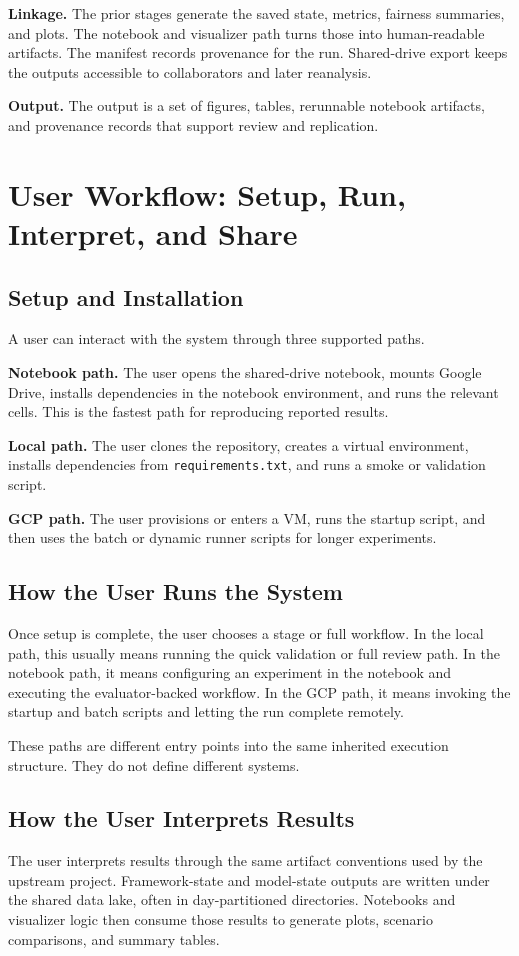 \documentclass{IEEEtran}
\begin{document}
\textbf{Linkage.} The prior stages generate the saved state, metrics,
fairness summaries, and plots. The notebook and visualizer path turns those
into human-readable artifacts. The manifest records provenance for the run.
Shared-drive export keeps the outputs accessible to collaborators and later
reanalysis.

\textbf{Output.} The output is a set of figures, tables, rerunnable notebook
artifacts, and provenance records that support review and replication.

\section{User Workflow: Setup, Run, Interpret, and Share}

\subsection{Setup and Installation}
A user can interact with the system through three supported paths.

\textbf{Notebook path.} The user opens the shared-drive notebook, mounts Google
Drive, installs dependencies in the notebook environment, and runs the relevant
cells. This is the fastest path for reproducing reported results.

\textbf{Local path.} The user clones the repository, creates a virtual
environment, installs dependencies from \texttt{requirements.txt}, and runs a
smoke or validation script.

\textbf{GCP path.} The user provisions or enters a VM, runs the startup script,
and then uses the batch or dynamic runner scripts for longer experiments.

\subsection{How the User Runs the System}
Once setup is complete, the user chooses a stage or full workflow. In the local
path, this usually means running the quick validation or full review path. In
the notebook path, it means configuring an experiment in the notebook and
executing the evaluator-backed workflow. In the GCP path, it means invoking the
startup and batch scripts and letting the run complete remotely.

These paths are different entry points into the same inherited execution
structure. They do not define different systems.

\subsection{How the User Interprets Results}
The user interprets results through the same artifact conventions used by the
upstream project. Framework-state and model-state outputs are written under the
shared data lake, often in day-partitioned directories. Notebooks and visualizer
logic then consume those results to generate plots, scenario comparisons, and
summary tables.
\end{document}
